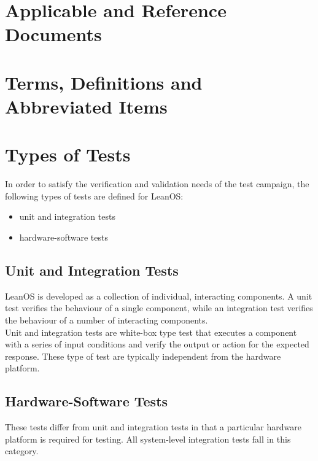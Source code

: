 \chapter{Applicable and Reference Documents} %

\printbibliography[heading=none]


\chapter{Terms, Definitions and Abbreviated Items}
\printglossary[type=acronym]
\printglossary[type=main, style=altlist]


\chapter{Types of Tests}

In order to satisfy the verification and validation needs of the test campaign,
the following types of tests are defined for LeanOS:
\begin{itemize}
	\item unit and integration tests
	\item hardware-software tests
\end{itemize}


\section {Unit and Integration Tests}

LeanOS is developed as a collection of individual, interacting components.
A unit test verifies the behaviour of a single component, while an integration
test verifies the behaviour of a number of interacting components. \\

\noindent
Unit and integration tests are white-box type test that executes a component
with a series of input conditions and verify the output or action for the
expected response. These type of test are typically independent from the
hardware platform.


\section {Hardware-Software Tests}

These tests differ from unit and integration tests in that a particular hardware
platform is required for testing. All system-level integration tests fall in
this category.


